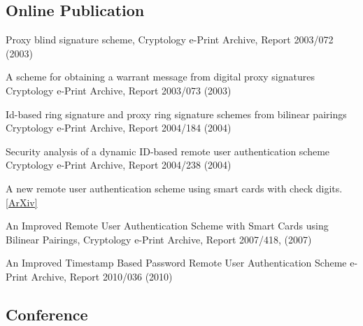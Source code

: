 \documentclass[letterpaper]{article}
\renewenvironment{itemize}{
  \begin{list}{}{
    \setlength{\leftmargin}{1.5em}
  }
}{
  \end{list}
}
\begin{document}
\subsection*{Online Publication}

\begin{itemize}
\item Proxy blind signature scheme, Cryptology e-Print Archive, Report 2003/072 
              (2003) 
\item A scheme for obtaining a warrant message from digital proxy signatures 
               Cryptology e-Print Archive, Report 2003/073 (2003) 
\item Id-based ring signature and proxy ring signature schemes from bilinear 
               pairings Cryptology e-Print Archive, Report 2004/184 (2004) 
\item Security    analysis of a  dynamic ID-based remote user  authentication  scheme
               Cryptology e-Print Archive, Report 2004/238 (2004) 
\item A new remote user authentication scheme using smart cards with check digits. 
               \href{http://arxiv.org/abs/cs.CR/0504094}{[ArXiv]}
\item An Improved Remote User Authentication Scheme with Smart Cards using 
               Bilinear Pairings, Cryptology e-Print Archive, Report 2007/418, (2007)
\item  An  Improved  Timestamp Based  Password  Remote  User  Authentication  
               Scheme e-Print Archive, Report 2010/036 (2010)

\end{itemize}

\subsection*{Conference}
\end{document}
